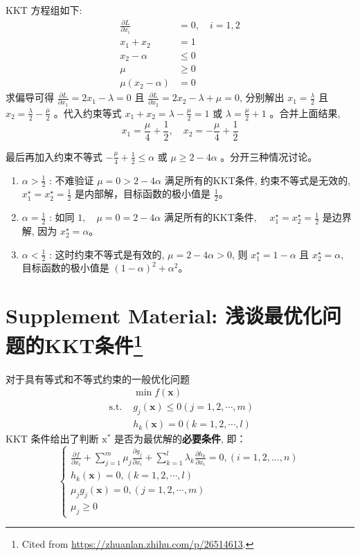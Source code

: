 KKT 方程组如下:
$$
\begin{aligned}
\frac{\partial L}{\partial x_{i}} &=0, \quad i=1,2 \\
x_{1}+x_{2} &=1 \\
x_{2}-\alpha & \leq 0 \\
\mu & \geq 0 \\
\mu\left(x_{2}-\alpha\right) &=0
\end{aligned}
$$
求偏导可得 $ \frac{\partial L}{\partial x_{1}}=2 x_{1}-\lambda=0 $ 且 $ \frac{\partial L}{\partial x_{2}}=2 x_{2}-\lambda+\mu=0 $, 分别解出 $ x_{1}=\frac{\lambda}{2} $ 且 $ x_{2}=\frac{\lambda}{2}-\frac{\mu}{2} $ 。代入约束等式 $ x_{1}+x_{2}=\lambda-\frac{\mu}{2}=1 $ 或 $ \lambda=\frac{\mu}{2}+1 $ 。合并上面结果,
$$
x_{1}=\frac{\mu}{4}+\frac{1}{2}, \quad x_{2}=-\frac{\mu}{4}+\frac{1}{2}
$$

最后再加入约束不等式 $ -\frac{\mu}{4}+\frac{1}{2} \leq \alpha $ 或 $ \mu \geq 2-4 \alpha $ 。分开三种情况讨论。

\begin{enumerate}
    \item $ \alpha>\frac{1}{2} $ : 不难验证 $ \mu=0>2-4 \alpha $ 满足所有的KKT条件, 约束不等式是无效的, $ x_{1}^{\star}=x_{2}^{\star}=\frac{1}{2} $ 是内部解，目标函数的极小值是 $ \frac{1}{2}$。
    \item $ \alpha=\frac{1}{2} $ : 如同 $ 1, \quad \mu=0=2-4 \alpha $ 满足所有的KKT条件, $ \quad x_{1}^{\star}=x_{2}^{\star}=\frac{1}{2} $ 是边界解, 因为 $ x_{2}^{\star}=\alpha $。
    \item $ \alpha<\frac{1}{2} $ : 这时约束不等式是有效的, $ \mu=2-4 \alpha>0 $, 则 $ x_{1}^{\star}=1-\alpha $ 且 $ x_{2}^{\star}=\alpha $, 目标函数的极小值是 $ (1-\alpha)^{2}+\alpha^{2} $。
\end{enumerate}

\section[Supplement Material: 浅谈最优化问题的KKT条件]{Supplement Material: 浅谈最优化问题的KKT条件\footnote{Cited from \url{https://zhuanlan.zhihu.com/p/26514613}.}}


\begin{theorem}[KKT条件]
    对于具有等式和不等式约束的一般优化问题
$$
\begin{aligned}
&\min f(\mathbf{x}) \\
\text { s.t. }& g_{j}(\mathbf{x}) \leq 0(j=1,2, \cdots, m) \\
&h_{k}(\mathbf{x})=0(k=1,2, \cdots, l)
\end{aligned}
$$
$ \mathrm{KKT} $ 条件给出了判断 $ \mathrm{x}^{*} $ 是否为最优解的\textbf{必要条件}, 即：
$$
\left\{\begin{array}{l}
\frac{\partial f}{\partial x_{i}}+\sum_{j=1}^{m} \mu_{j} \frac{\partial g_{j}}{\partial x_{i}}+\sum_{k=1}^{l} \lambda_{k} \frac{\partial h_{k}}{\partial x_{i}}=0,(i=1,2, \ldots, n) \\
h_{k}(\mathbf{x})=0,(k=1,2, \cdots, l) \\
\mu_{j} g_{j}(\mathbf{x})=0,(j=1,2, \cdots, m) \\
\mu_{j} \geq 0
\end{array}\right.
$$
\end{theorem}


